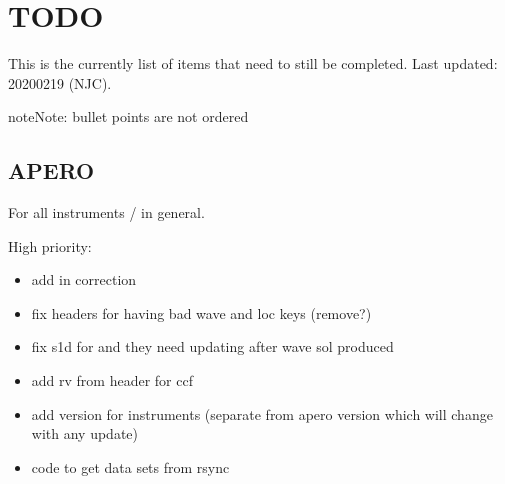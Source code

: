 \documentclass[a4paper,10pt,english]{report}
\begin{document}
\section{TODO}
\label{\detokenize{user/general/todo:todo}}\label{\detokenize{user/general/todo:id1}}\label{\detokenize{user/general/todo::doc}}
This is the currently list of items that need to still be completed.
Last updated: 2020\sphinxhyphen{}02\sphinxhyphen{}19 (NJC).

\begin{sphinxadmonition}{note}{Note:}
bullet points are not ordered
\end{sphinxadmonition}


\subsection{APERO}
\label{\detokenize{user/general/todo:apero}}
For all instruments / in general.

High priority:
\begin{itemize}
\item {} 
add in  correction

\item {} 
fix headers for having bad wave and loc keys (remove?)

\item {} 
fix s1d for  and  they need updating after wave sol produced

\item {} 
add rv from header for ccf

\item {} 
add version for instruments (separate from apero version which will change with any update)

\item {} 
code to get data sets from rsync

\end{itemize}
\end{document}
